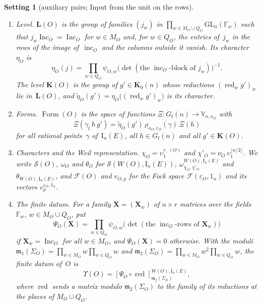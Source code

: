 \documentclass[11pt,a4paper]{article}
\newcommand{\m}[1]{\mbox{$#1$}}        %
\theoremstyle{plainx}
\theoremstyle{uprightx}
\newtheorem{setting}[theorem]{Setting}          %
\newcommand{\FF}{\mathbb{F}}
\newcommand{\Gfin}[1]{G_{\mathrm{f}}(#1)}
\newcommand{\Kz}[1]{\mathbf{K}_{0}(#1)}
\newcommand{\std}[2]{\mathrm{I}_{#2}(#1)}
\newcommand{\one}[1]{1_{#1}}
\newcommand{\WO}[1]{W(#1)}
\newcommand{\sgO}[1]{\varepsilon_{#1}}
\newcommand{\rmi}[1]{r_{-}(#1)}
\newcommand{\incO}[1]{\operatorname{inc}_{#1}}
\newcommand{\IncM}[1]{\operatorname{Inc}_{#1}}
\newcommand{\kap}[1]{\kappa_{#1}}
\newcommand{\eO}[1]{e_{#1}}
\newcommand{\muO}[1]{\nu_{#1}}
\newcommand{\psiO}[2]{\psi_{#1,#2}}
\newcommand{\MO}[1]{M_{#1}}
\newcommand{\QO}[1]{Q_{#1}}
\newcommand{\SigO}[1]{\Sigma_{#1}}
\newcommand{\chO}[1]{\chi_{#1}}
\newcommand{\chpO}[1]{\chi'_{#1}}
\newcommand{\omO}[1]{\omega_{#1}}
\newcommand{\thO}[1]{\theta_{#1}}
\newcommand{\SO}[1]{\mathcal{S}(#1)}
\newcommand{\LO}[1]{\mathbf{L}(#1)}
\newcommand{\KO}[1]{\mathbf{K}(#1)}
\newcommand{\etaO}[1]{\eta_{#1}}
\newcommand{\tetaO}[1]{\tilde{\eta}_{#1}}
\newcommand{\Ups}[1]{\Upsilon(#1)}
\newcommand{\PsiO}[2]{\Psi_{#1}(#2)}
\newcommand{\FormO}[1]{\operatorname{Form}(#1)}
\newcommand{\Vk}[2]{\mathbb{V}_{#1,#2}}
\newcommand{\rhoW}[2]{\rho_{#1,#2}}
\newcommand{\pvO}[2]{v_{#1,#2}}
\newcommand{\FockO}[1]{\mathcal{F}(#1)}
\newcommand{\FockP}[2]{\mathcal{F}(#1,#2)}
\newcommand{\pvP}[3]{v^{#1,#2}_{#3}}
\newcommand{\Sch}[1]{S_{#1}}
\newcommand{\lmod}[2]{\mathfrak{m}_{#2}(#1)}
\newcommand{\red}[1]{\operatorname{red}_{#1}}
\newcommand{\conj}[1]{\overline{#1}}
\begin{document}
\begin{setting}[auxiliary pairs; Input from the unit on the rows]
\begin{enumerate}[label=\textup{(\alph*)},leftmargin=2.2em,itemsep=2pt,topsep=2pt]
\m{\Vk{n}{\kap{O}}} lets \m{h=(h_{\tau})} act by
\m{\prod_{\tau}\det(\conj{h_{\tau}})^{\eO{O}(\tau)}\,\Sch{\kap{O}}(\conj{h})}, with \m{\conj{h}} the family of the complex
conjugate matrices; rational points of \m{\std{E}{n}} act through their images at the infinite places.
\item \emph{Level.} \m{\LO{O}} is the group of families \m{(j_{w})} in
\m{\prod_{w\in\MO{O}\cup\QO{O}}\mathrm{GL}_{n}(\FF_{w})} such that \m{j_{w}\IncM{O}=\IncM{O}} for \m{w\in\MO{O}} and,
for \m{w\in\QO{O}}, the entries of~$j_{w}$ in the rows of the image of~$\incO{O}$ and the columns outside it
vanish. Its character~\m{\etaO{O}} is
\[
\etaO{O}(j)=\prod_{w\in\QO{O}}\psiO{O}{w}\bigl(\det(\text{the }\incO{O}\text{-block of }j_{w})\bigr)^{-1}.
\]
The level
\m{\KO{O}} is the group of \m{g'\in\Kz{n}} whose reductions \m{(\red{w}g')_{w}} lie in~\m{\LO{O}}, and
\m{\tetaO{O}(g')=\etaO{O}\bigl((\red{w}g')_{w}\bigr)} is its character.
\item \emph{Forms.} \m{\FormO{O}} is the space of functions \m{\Xi\colon\Gfin{n}\to\Vk{n}{\kap{O}}} with
\[
\Xi(\gamma_{\mathrm{f}}\,h\,g')=\tetaO{O}(g')\,\rhoW{\kap{O}}{\eO{O}}(\gamma)\,\Xi(h)
\]
for all rational points~$\gamma$ of~\m{\std{E}{n}}, all \m{h\in\Gfin{n}} and all \m{g'\in\KO{O}}.
\item \emph{Characters and the Weil representation.} \m{\chO{O}=\upsilon_{1}^{\rmi{O}}} and
\m{\chpO{O}=\muO{O}\,\upsilon_{1}^{\lfloor n/2\rfloor}}. We write \m{\SO{O}}, \m{\omO{O}} and \m{\thO{O}} for
\m{\mathcal{S}(\WO{O},\std{E}{n})}, \m{\omega^{\WO{O},\std{E}{n}}_{\chO{O},\chpO{O}}} and
\m{\theta_{\WO{O},\std{E}{n}}}, and \m{\FockO{O}} and \m{\pvO{O}{p}} for the Fock space
\m{\FockP{\sgO{O}}{\one{n}}} and its vectors \m{\pvP{\sgO{O}}{\one{n}}{p}}.
\item \emph{The finite datum.} For a family \m{\mathbf{X}=(\mathbf{X}_{w})} of \m{n\times r} matrices over the fields~$\FF_{w}$,
\m{w\in\MO{O}\cup\QO{O}}, put
\[
\PsiO{O}{\mathbf{X}}=\prod_{w\in\QO{O}}\psiO{O}{w}\bigl(\det(\text{the }\incO{O}\text{-rows of }\mathbf{X}_{w})\bigr)
\]
if \m{\mathbf{X}_{w}=\IncM{O}} for all \m{w\in\MO{O}}, and \m{\PsiO{O}{\mathbf{X}}=0} otherwise.
With the moduli \m{\lmod{\SigO{O}}{1}=\prod_{w\in\MO{O}}w\prod_{w\in\QO{O}}w} and
\m{\lmod{\SigO{O}}{2}=\prod_{w\in\MO{O}}w^{2}\prod_{w\in\QO{O}}w}, the finite datum of~$O$ is
\[
\Ups{O}=[\Psi_{O}\circ\operatorname{red}]^{\WO{O},\std{E}{n}}_{\lmod{\SigO{O}}{2}},
\]
where \m{\operatorname{red}} sends a matrix modulo \m{\lmod{\SigO{O}}{2}} to the family of its reductions at the
places of \m{\MO{O}\cup\QO{O}}.

\end{enumerate}
\end{setting}
\end{document}
